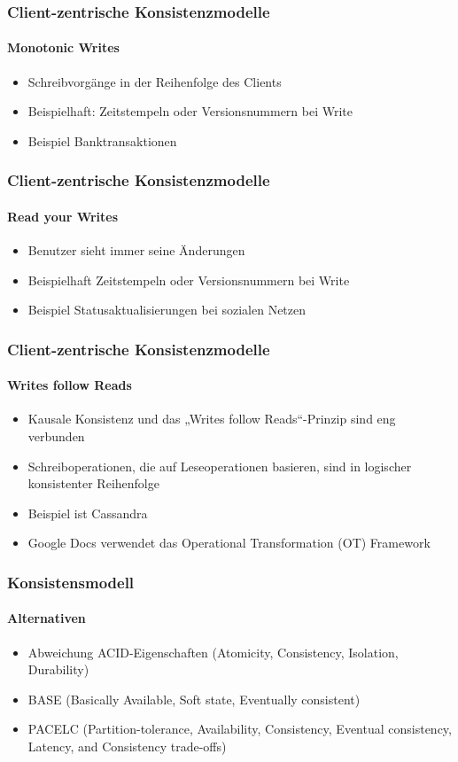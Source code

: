 \begin{frame}
  \frametitle{Client-zentrische Konsistenzmodelle}
  \framesubtitle{Monotonic Writes}
  \begin{itemize}
    \item Schreibvorgänge in der Reihenfolge des Clients
    \item Beispielhaft: Zeitstempeln oder Versionsnummern bei Write 
    \item Beispiel Banktransaktionen
  \end{itemize}
\end{frame}

\begin{frame}
  \frametitle{Client-zentrische Konsistenzmodelle}
  \framesubtitle{Read your Writes}
  \begin{itemize}
    \item Benutzer sieht immer seine Änderungen
    \item Beispielhaft Zeitstempeln oder Versionsnummern bei Write 
    \item Beispiel Statusaktualisierungen bei sozialen Netzen
  \end{itemize}
\end{frame}


\begin{frame}
  \frametitle{Client-zentrische Konsistenzmodelle}
  \framesubtitle{Writes follow Reads}
  \begin{itemize}
    \item Kausale Konsistenz und das „Writes follow Reads“-Prinzip sind eng verbunden
    \item  Schreiboperationen, die auf Leseoperationen basieren, sind in logischer konsistenter Reihenfolge
    \item Beispiel ist Cassandra 
    \item Google Docs verwendet das Operational Transformation (OT) Framework 
  \end{itemize}
\end{frame}


\begin{frame}
  \frametitle{Konsistensmodell}
  \framesubtitle{Alternativen}
  \begin{itemize}
    \item Abweichung ACID-Eigenschaften (Atomicity, Consistency, Isolation, Durability)
    \item BASE (Basically Available, Soft state, Eventually consistent)
    \item PACELC (Partition-tolerance, Availability, Consistency, Eventual consistency, Latency, and Consistency trade-offs) 
  \end{itemize}
\end{frame}

